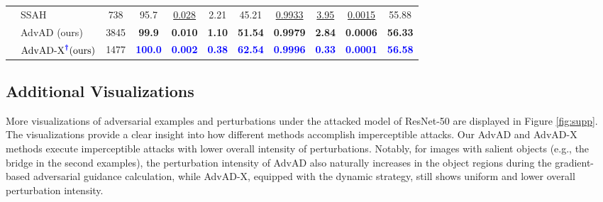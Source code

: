 \documentclass{article}
\begin{document}
\begin{table}[!h]
{\begin{tabular}{cp{2.2cm}ccccccccc}
                                    & SSAH  & 738   & 95.7     & \underline{0.028}     & 2.21      & 45.21     & \underline{0.9933}   & \underline{3.95}    & \underline{0.0015}   & 55.88 \\
                                    \cmidrule(lr){2-11}
                                    & AdvAD (ours)       & 3845   & \textbf{99.9}     & \textbf{0.010}     & \textbf{1.10}      & \textbf{51.54}     & \textbf{0.9979}   & \textbf{2.84}    & \textbf{0.0006}   & \textbf{56.33} \\
                                    & $\text{AdvAD-X}^{\textcolor{blue}{\boldsymbol{\dag}}} \text{(ours)}$ & 1477  & \textcolor{blue}{\textbf{100.0}}   & \textcolor{blue}{\textbf{0.002}}   & \textcolor{blue}{\textbf{0.38}}    & \textcolor{blue}{\textbf{62.54}}    & \textcolor{blue}{\textbf{0.9996}}   & \textcolor{blue}{\textbf{0.33}}    & \textcolor{blue}{\textbf{0.0001}}   & \textcolor{blue}{\textbf{56.58}} \\
        \bottomrule
    \end{tabular}}
    \label{supp_table}
\end{table}


\subsection{Additional Visualizations} \label{app:C2}
More visualizations of adversarial examples and perturbations under the attacked model of ResNet-50 are displayed in Figure \ref{fig:supp}. The visualizations provide a clear insight into how different methods accomplish imperceptible attacks. Our AdvAD and AdvAD-X methods execute imperceptible attacks with lower overall intensity of perturbations. Notably, for images with salient objects (e.g., the bridge in the second examples), the perturbation intensity of AdvAD also naturally increases in the object regions during the gradient-based adversarial guidance calculation, while AdvAD-X, equipped with the dynamic strategy, still shows uniform and lower overall perturbation intensity.
\end{document}
